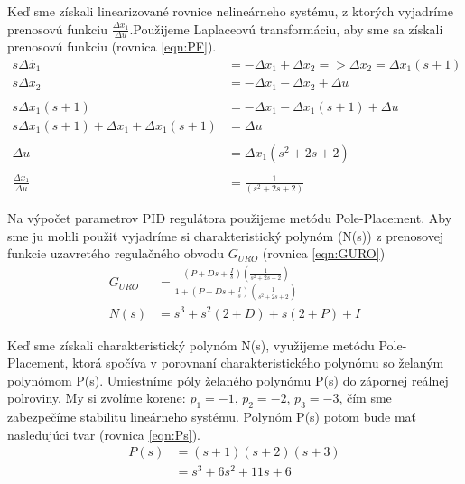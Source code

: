 \documentclass[../main.tex]{subfiles}
\begin{document}
Keď sme získali linearizované rovnice nelineárneho systému, z ktorých vyjadríme prenosovú funkciu $\frac{\Delta x_1}{\Delta u}$.Použijeme Laplaceovú transformáciu, aby sme sa získali prenosovú funkciu (rovnica \ref{eqn:PF}).
\begin{equation}
\begin{aligned} 
s\Delta \dot{x_1}  &= -\Delta x_1 + \Delta x_2 => \Delta x_2 = \Delta x_1(s+1) \\
s\Delta \dot{x_2} & = -\Delta x_1 - \Delta x_2 + \Delta u \\\\
s\Delta x_1(s+1) & = -\Delta x_1 - \Delta x_1(s+1) + \Delta u\\
s\Delta x_1(s+1) + \Delta x_1 + \Delta x_1(s+1) & = \Delta u\\\\
\Delta u & = \Delta x_1(s^2+2s+2)\\\\
\frac{\Delta x_1}{\Delta u} & = \frac{1}{(s^2+2s+2)}\
 \end{aligned}
 \label{eqn:PF}
\end{equation}	

Na výpočet parametrov PID regulátora použijeme metódu Pole-Placement. Aby sme ju mohli použiť vyjadríme si charakteristický polynóm (N(s)) z prenosovej funkcie uzavretého regulačného obvodu ${G_{URO}}$ (rovnica \ref{eqn:GURO})
\begin{equation}
	\begin{aligned}
	G_{URO} &= \frac{(P+Ds+\frac{I}{s})(\frac{1}{s^2+2s+2})}{1+(P+Ds+\frac{I}{s})(\frac{1}{s^2+2s+2})}  \\
		N(s)	&= s^3+s^2(2+D)+s(2+P)+I
	\end{aligned}
	\label{eqn:GURO}
\end{equation}

Keď sme získali charakteristický polynóm N(s), využijeme  metódu Pole-Placement, ktorá spočíva v porovnaní charakteristického polynómu so želaným polynómom P(s). Umiestníme póly želaného polynómu P(s) do zápornej reálnej polroviny. My si zvolíme korene: $p_1 = -1$, $p_2 = -2$, $p_3 = -3$, čím sme zabezpečíme stabilitu lineárneho systému. Polynóm P(s) potom bude mať nasledujúci tvar (rovnica \ref{eqn:Ps}). 
\begin{equation}
	\begin{aligned}
	P(s) &= (s + 1)(s + 2)(s + 3) \\
		 &= s^3 + 6s^2 + 11s + 6 \\
	\end{aligned}
\label{eqn:Ps}
\end{equation}
\end{document}
